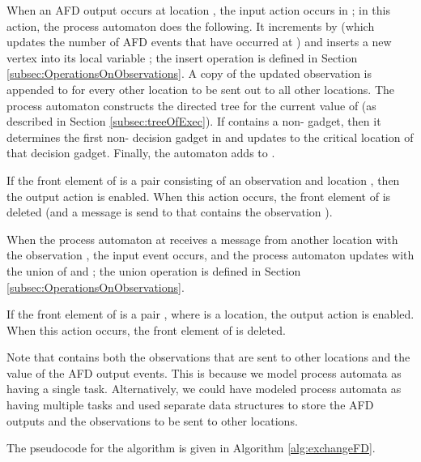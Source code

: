 \documentclass[11pt]{article}
\numberwithin{theorem}{section}
\begin{document}
When an AFD output  occurs at location , the input action
 occurs in ; in this action, the process automaton does 
the following.
It increments  by  (which updates the number of AFD events that
have occurred at ) and inserts a new vertex  into its local variable ; the insert operation is defined in Section \ref{subsec:OperationsOnObservations}.
A copy of the updated observation  is appended to  for every
other location to be sent out to all other locations. The process automaton
constructs the directed tree  for the current value of  (as described in Section \ref{subsec:treeOfExec}). If  contains a non- gadget, then it determines the first non- decision gadget in 
 and
updates  to the critical location of that decision gadget. Finally, the automaton adds
 to .

If the front element of  is a pair consisting of an observation 
and  location , then the output action  is enabled. When this
action occurs, the front element of  is deleted (and a message is
send to  that contains the observation ).

When the process automaton at  receives a message from another
location  with the observation , the input event 
occurs, and the process automaton updates  with the union of 
and ; the union operation is defined in Section \ref{subsec:OperationsOnObservations}.

If the front element of  is a pair , where  is a location,
the output action  is enabled. When this action occurs, 
the front element of  is deleted.

Note that  contains both the observations that are sent to other locations and the value of the  AFD output events. This is because we model process automata as having a single task. Alternatively, we could have modeled process automata as having multiple tasks and used separate data structures to store the AFD outputs and the observations to be sent to other locations.



 The pseudocode for the algorithm is given in Algorithm \ref{alg:exchangeFD}.
\end{document}
